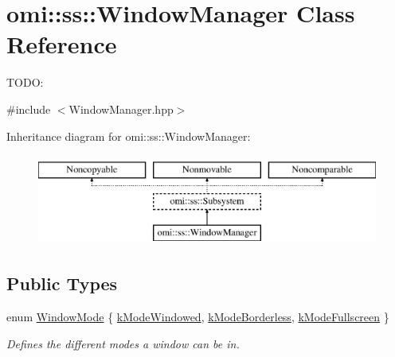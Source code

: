 \hypertarget{classomi_1_1ss_1_1_window_manager}{}\section{omi\+:\+:ss\+:\+:Window\+Manager Class Reference}
\label{classomi_1_1ss_1_1_window_manager}


T\+O\+DO\+:  




{\ttfamily \#include $<$Window\+Manager.\+hpp$>$}

Inheritance diagram for omi\+:\+:ss\+:\+:Window\+Manager\+:\begin{figure}[H]
\begin{center}
\leavevmode
\includegraphics[height=3.000000cm]{classomi_1_1ss_1_1_window_manager}
\end{center}
\end{figure}
\subsection*{Public Types}
\begin{DoxyCompactItemize}
\item 
enum \hyperlink{classomi_1_1ss_1_1_window_manager_a84030b04e5b4c01a0d94ae67f5872cf9}{Window\+Mode} \{ \hyperlink{classomi_1_1ss_1_1_window_manager_a84030b04e5b4c01a0d94ae67f5872cf9ac5ece0f474e1fe7d5e573f193976cc7b}{k\+Mode\+Windowed}, 
\hyperlink{classomi_1_1ss_1_1_window_manager_a84030b04e5b4c01a0d94ae67f5872cf9aa4e946016788e23457b4a193e12936bb}{k\+Mode\+Borderless}, 
\hyperlink{classomi_1_1ss_1_1_window_manager_a84030b04e5b4c01a0d94ae67f5872cf9a35ada317baed6c897ffc176b37904451}{k\+Mode\+Fullscreen}
 \}\begin{DoxyCompactList}\small\item\em Defines the different modes a window can be in. \end{DoxyCompactList}
\end{DoxyCompactItemize}
